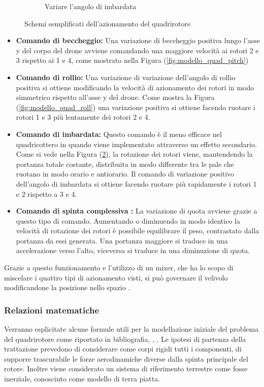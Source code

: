 \begin{figure}
\begin{subfigure}{0.45\textwidth}
		\caption{Variare l'angolo di imbardata}
		\label{fig:modello_quad_yaw}
	\end{subfigure}
	\caption{Schemi semplificati dell'azionamento del quadrirotore}
\end{figure}
\begin{itemize}
	\item \textbf{Comando di beccheggio:} Una variazione di beccheggio positiva lungo l'asse y del corpo del drone avviene comandando una maggiore velocità ai rotori 2 e 3 rispetto ai 1 e 4, come mostrato nella Figura (\ref{fig:modello_quad_pitch})
	\item \textbf{Comando di rollio:} Una variazione di variazione dell'angolo di rollio positiva si ottiene modificando la velocità di azionamento dei rotori in modo simmetrico rispetto all'asse y del drone. Come mostra la Figura (\ref{fig:modello_quad_roll}) una variazione positiva si ottiene facendo ruotare i rotori 1 e 3 più lentamente dei rotori 2 e 4.
	\item \textbf{Comando di imbardata:} Questo comando è il meno efficace nel quadricottero in quando viene implementato attraverso un effetto secondario. Come si vede nella Figura (\ref{fig:modello_quad_yaw}), la rotazione dei rotori viene, mantendendo la portanza totale costante, distribuita in modo differente tra le pale che ruotano in modo orario e antiorario. Il comando di variazione positivo dell'angolo di imbardata si ottiene facendo ruotare più rapidamente i rotori 1 e 2 rispetto a 3 e 4.
	\item \textbf{Comando di spinta complessiva : } La variazione di quota avviene grazie a questo tipo di comando. Aumentando o diminuendo in modo identico la velocità di rotazione dei rotori è possibile equilibrare il peso, contrastato dalla portanza da essi generata. Una portanza maggiore si traduce in una accelerazione verso l'alto, viceversa si traduce in una diminuzione di quota.
\end{itemize}
Grazie a questo funzionamento e l'utilizzo di un mixer, che ha lo scopo di miscelare i quattro tipi di azionamento visti, si può governare il velivolo modificandone la posizione nello spazio \cite{DesTestCarm}.
\subsubsection{Relazioni matematiche}
Verranno esplicitate alcune formule utili per la modellazione iniziale del problema del quadrirotore come riportato in bibliografia, \cite{DesTestCarm}, \cite{baseTesi}. Le ipotesi di partenza della trattazione prevedono di considerare come corpi rigidi tutti i componenti, di supporre trascurabile le forze aerodinamiche diverse dalla spinta principale del rotore. Inoltre viene considerato un sistema di riferimento terrestre come fosse inerziale, conosciuto come modello di terra piatta.

